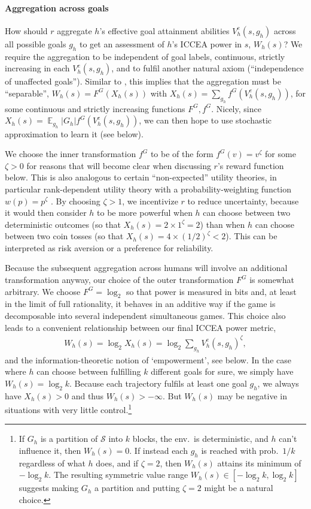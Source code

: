 \documentclass[letterpaper]{article} %
\DeclareMathOperator*{\E}{\mathbb{E}}
\def\S{\mathcal{S}}
\def\ld{\log_2}
\begin{document}
\paragraph{Aggregation across goals}
How should $r$ aggregate $h$'s effective goal attainment abilities $V^e_h(s,g_h)$ across all possible goals $g_h$ to get an assessment of $h$'s ICCEA power in $s$, $W_h(s)$? 
We require the aggregation to be independent of goal labels, continuous, strictly increasing in each $V^e_h(s,g_h)$, and to fulfil another natural axiom (``independence of unaffected goals''). 
Similar to \citet{fleming1952cardinal}, this implies that the aggregation must be ``separable'', $W_h(s) = F^G(X_h(s))$ with $X_h(s)=\sum_{g_h} f^G(V^e_h(s,g_h))$, for some continuous and strictly increasing functions $F^G,f^G$.
Nicely, since $X_h(s) = \E_{g_h} |G_h| f^G(V^e_h(s,g_h))$, we can then hope to use stochastic approximation to learn it (see below).

We choose the inner transformation $f^G$ to be of the form $f^G(v)=v^\zeta$ for some $\zeta>0$ for reasons that will become clear when discussing $r$'s reward function below.
This is also analogous to certain ``non-expected'' utility theories, in particular rank-dependent utility theory with a probability-weighting function $w(p)=p^\zeta$ \cite{quiggin1982theory}.
By choosing $\zeta>1$, we incentivize $r$ to reduce uncertainty, because it would then consider $h$ to be more powerful when $h$ can choose between two deterministic outcomes (so that $X_h(s)=2\times 1^\zeta=2$) than when $h$ can choose between two coin tosses (so that $X_h(s)=4\times (1/2)^\zeta<2$).
This can be interpreted as risk aversion or a preference for reliability.

Because the subsequent aggregation across humans will involve an additional transformation anyway, our choice of the outer transformation $F^G$ is somewhat arbitrary. 
We choose $F^G=\ld$ so that power is measured in bits and, at least in the limit of full rationality, it behaves in an additive way if the game is decomposable into several independent simultaneous games.
This choice also leads to a convenient relationship between our final ICCEA power metric, 
\begin{align}
    W_h(s) = \textstyle\ld X_h(s) = \ld\sum_{g_h} V^e_h(s,g_h)^\zeta,
\end{align}
and the information-theoretic notion of `empowerment', see below. 
In the case where $h$ can choose between fulfilling $k$ different goals for sure, we simply have $W_h(s) = \ld k$.
Because each trajectory fulfils at least one goal $g_h$, we always have $X_h(s)>0$ and thus $W_h(s)>-\infty$.
But $W_h(s)$ may be negative in situations with very little control.\footnote{
    If $G_h$ is a partition of $\S$ into $k$ blocks,
    the env.\ is deterministic, and $h$ can't influence it, then $W_h(s)=0$.
    If instead each $g_h$ is reached with prob.~$1/k$ regardless of what $h$ does, and if $\zeta=2$, then $W_h(s)$ attains its minimum of $-\ld k$.
    The resulting symmetric value range $W_h(s)\in[-\ld k,\ld k]$ suggests making $G_h$ a partition and putting $\zeta=2$ might be a natural choice.}
\end{document}
